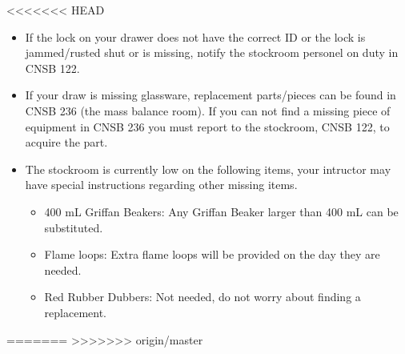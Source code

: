 \documentclass[12pt]{article}
\begin{document}
<<<<<<< HEAD
\begin{itemize}
\item If the lock on your drawer does not have the correct ID or the lock is jammed/rusted shut or is missing, notify the stockroom personel on duty in CNSB 122.
\item If your draw is missing glassware, replacement parts/pieces can be found in CNSB 236 (the mass balance room). If you can not find a missing piece of equipment in CNSB 236 you must report to the stockroom, CNSB 122, to acquire the part.
\item The stockroom is currently low on the following items, your intructor may have special instructions regarding other missing items.
\begin{itemize}
\item 400 mL Griffan Beakers: Any Griffan Beaker larger than 400 mL can be substituted.
\item Flame loops: Extra flame loops will be provided on the day they are needed.
\item Red Rubber Dubbers: Not needed, do not worry about finding a replacement.
\end{itemize}
\end{itemize}
=======
>>>>>>> origin/master
\end{document}
